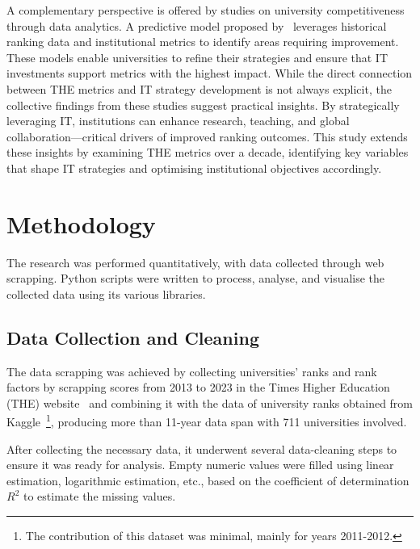 \documentclass[conference]{IEEEtran}
\begin{document}
A complementary perspective is offered by studies on university competitiveness through data analytics. A predictive model proposed by~\cite{analytics2022competitiveness} leverages historical ranking data and institutional metrics to identify areas requiring improvement. These models enable universities to refine their strategies and ensure that IT investments support metrics with the highest impact. While the direct connection between THE metrics and IT strategy development is not always explicit, the collective findings from these studies suggest practical insights. By strategically leveraging IT, institutions can enhance research, teaching, and global collaboration—critical drivers of improved ranking outcomes. This study extends these insights by examining THE metrics over a decade, identifying key variables that shape IT strategies and optimising institutional objectives accordingly.





\section{Methodology}
\label{sec:methodology}

The research was performed quantitatively, with data collected through web scrapping. Python scripts were written to process, analyse, and visualise the collected data using its various libraries. 

\subsection{Data Collection and Cleaning}

The data scrapping was achieved by collecting universities' ranks and rank factors by scrapping scores from 2013 to 2023 in the Times Higher Education (THE) website~\cite{the2024} and combining it with the data of university ranks obtained from Kaggle~\cite{ONeil_2020}\footnote{The contribution of this dataset was minimal, mainly for years 2011-2012.}, producing more than 11-year data span with 711 universities involved. 

After collecting the necessary data, it underwent several data-cleaning steps to ensure it was ready for analysis. Empty numeric values were filled using linear estimation, logarithmic estimation, etc., based on the coefficient of determination $R^{2}$ to estimate the missing values. 
\end{document}
